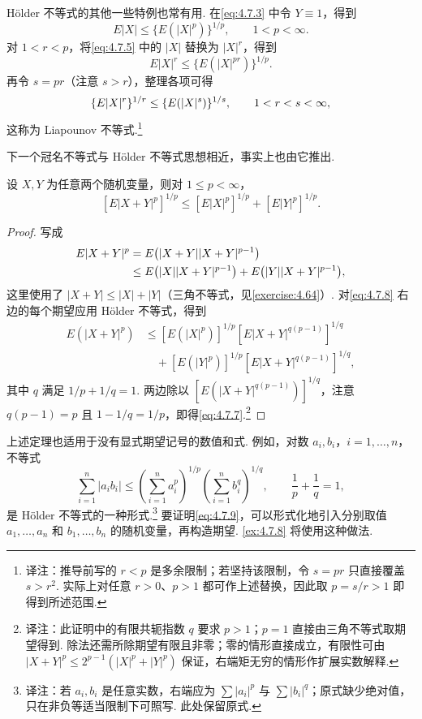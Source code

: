 H\"older 不等式的其他一些特例也常有用. 在\eqref{eq:4.7.3} 中令 $Y\equiv1$，得到
\begin{equation}\label{eq:4.7.5}
E|X|\le\{E(|X|^p)\}^{1/p},\qquad1<p<\infty.
\end{equation}
对 $1<r<p$，将\eqref{eq:4.7.5} 中的 $|X|$ 替换为 $|X|^r$，得到
$$E|X|^r\le\{E(|X|^{pr})\}^{1/p}.$$
再令 $s=pr$（注意 $s>r$），整理各项可得
\begin{equation}\label{eq:4.7.6}\index{SI0570@Liapounov}
\{E|X|^r\}^{1/r}\le\{E(|X|^s)\}^{1/s},\qquad1<r<s<\infty,
\end{equation}
这称为 Liapounov 不等式.\footnote{译注：推导前写的 $r<p$ 是多余限制；若坚持该限制，令 $s=pr$ 只直接覆盖 $s>r^2$. 实际上对任意 $r>0$、$p>1$ 都可作上述替换，因此取 $p=s/r>1$ 即得到所述范围.}

下一个冠名不等式与 H\"older 不等式思想相近，事实上也由它推出.
\begin{theorem}\label{thm:4.7.5}
设 $X,Y$ 为任意两个随机变量，则对 $1\le p<\infty$，
\begin{equation}\label{eq:4.7.7}
[E|X+Y|^p]^{1/p}\le[E|X|^p]^{1/p}+[E|Y|^p]^{1/p}.
\end{equation}
\end{theorem}
\begin{proof}
写成
\begin{equation}\label{eq:4.7.8}\index{SI0578@三角}
\begin{aligned}
E|X+Y|^p&=E\bigl(|X+Y||X+Y|^{p-1}\bigr)\\
&\le E\bigl(|X||X+Y|^{p-1}\bigr)+E\bigl(|Y||X+Y|^{p-1}\bigr),
\end{aligned}
\end{equation}
这里使用了 $|X+Y|\le|X|+|Y|$（三角不等式，见\autoref{exercise:4.64}）. 对\eqref{eq:4.7.8} 右边的每个期望应用 H\"older 不等式，得到
$$\begin{aligned}
E(|X+Y|^p)&\le[E(|X|^p)]^{1/p}[E|X+Y|^{q(p-1)}]^{1/q}\\
&\quad+[E(|Y|^p)]^{1/p}[E|X+Y|^{q(p-1)}]^{1/q},
\end{aligned}$$
其中 $q$ 满足 $1/p+1/q=1$. 两边除以 $[E(|X+Y|^{q(p-1)})]^{1/q}$，注意 $q(p-1)=p$ 且 $1-1/q=1/p$，即得\eqref{eq:4.7.7}.\footnote{译注：此证明中的有限共轭指数 $q$ 要求 $p>1$；$p=1$ 直接由三角不等式取期望得到. 除法还需所除期望有限且非零；零的情形直接成立，有限性可由 $|X+Y|^p\le2^{p-1}(|X|^p+|Y|^p)$ 保证，右端矩无穷的情形作扩展实数解释.}
\end{proof}
上述定理也适用于没有显式期望记号的数值和式. 例如，对数 $a_i,b_i$，$i=1,\ldots,n$，不等式
\begin{equation}\label{eq:4.7.9}
\sum_{i=1}^n|a_ib_i|\le\left(\sum_{i=1}^na_i^p\right)^{1/p}\left(\sum_{i=1}^nb_i^q\right)^{1/q},\qquad\frac1p+\frac1q=1,
\end{equation}
是 H\"older 不等式的一种形式.\footnote{译注：若 $a_i,b_i$ 是任意实数，右端应为 $\sum|a_i|^p$ 与 $\sum|b_i|^q$；原式缺少绝对值，只在非负等适当限制下可照写. 此处保留原式.} 要证明\eqref{eq:4.7.9}，可以形式化地引入分别取值 $a_1,\ldots,a_n$ 和 $b_1,\ldots,b_n$ 的随机变量，再构造期望. \autoref{ex:4.7.8} 将使用这种做法.

